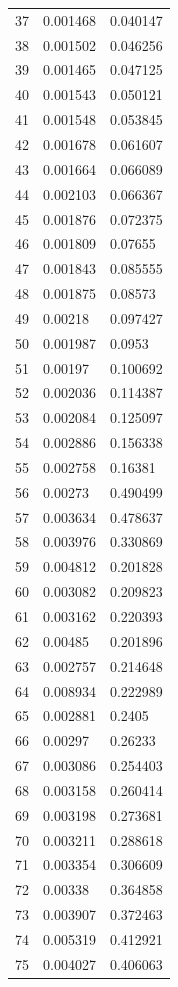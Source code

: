 \documentclass[runningheads]{llncs}
\begin{document}
\begin{longtable}{| p{} | p{} | p{} |}
37 & 0.001468 & 0.040147 \\
38 & 0.001502 & 0.046256 \\
39 & 0.001465 & 0.047125 \\
40 & 0.001543 & 0.050121 \\
41 & 0.001548 & 0.053845 \\
42 & 0.001678 & 0.061607 \\
43 & 0.001664 & 0.066089 \\
44 & 0.002103 & 0.066367 \\
45 & 0.001876 & 0.072375 \\
46 & 0.001809 & 0.07655 \\
47 & 0.001843 & 0.085555 \\
48 & 0.001875 & 0.08573 \\
49 & 0.00218 & 0.097427 \\
50 & 0.001987 & 0.0953 \\
51 & 0.00197 & 0.100692 \\
52 & 0.002036 & 0.114387 \\
53 & 0.002084 & 0.125097 \\
54 & 0.002886 & 0.156338 \\
55 & 0.002758 & 0.16381 \\
56 & 0.00273 & 0.490499 \\
57 & 0.003634 & 0.478637 \\
58 & 0.003976 & 0.330869 \\
59 & 0.004812 & 0.201828 \\
60 & 0.003082 & 0.209823 \\
61 & 0.003162 & 0.220393 \\
62 & 0.00485 & 0.201896 \\
63 & 0.002757 & 0.214648 \\
64 & 0.008934 & 0.222989 \\
65 & 0.002881 & 0.2405 \\
66 & 0.00297 & 0.26233 \\
67 & 0.003086 & 0.254403 \\
68 & 0.003158 & 0.260414 \\
69 & 0.003198 & 0.273681 \\
70 & 0.003211 & 0.288618 \\
71 & 0.003354 & 0.306609 \\
72 & 0.00338 & 0.364858 \\
73 & 0.003907 & 0.372463 \\
74 & 0.005319 & 0.412921 \\
75 & 0.004027 & 0.406063 \\

\end{longtable}
\end{document}
